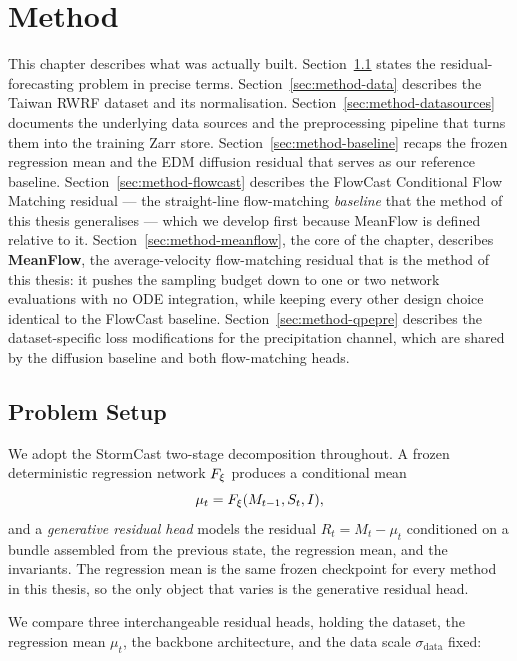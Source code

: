 
\chapter{Method}
\label{ch:method}

This chapter describes what was actually built. Section~\ref{sec:method-problem} states the residual-forecasting problem in precise terms. Section~\ref{sec:method-data} describes the Taiwan RWRF dataset and its normalisation. Section~\ref{sec:method-datasources} documents the underlying data sources and the preprocessing pipeline that turns them into the training Zarr store. Section~\ref{sec:method-baseline} recaps the frozen regression mean and the EDM diffusion residual that serves as our reference baseline. Section~\ref{sec:method-flowcast} describes the FlowCast Conditional Flow Matching residual --- the straight-line flow-matching \emph{baseline} that the method of this thesis generalises --- which we develop first because MeanFlow is defined relative to it. Section~\ref{sec:method-meanflow}, the core of the chapter, describes \textbf{MeanFlow}, the average-velocity flow-matching residual that is the method of this thesis: it pushes the sampling budget down to one or two network evaluations with no ODE integration, while keeping every other design choice identical to the FlowCast baseline. Section~\ref{sec:method-qpepre} describes the dataset-specific loss modifications for the precipitation channel, which are shared by the diffusion baseline and both flow-matching heads.

\section{Problem Setup}
\label{sec:method-problem}

We adopt the StormCast two-stage decomposition throughout. A frozen deterministic regression network $F_{\xi}$ produces a conditional mean
\begin{equation}
  \mu_t = F_{\xi}(M_{t-1}, S_t, I),
\end{equation}
and a \emph{generative residual head} models the residual $R_t = M_t - \mu_t$ conditioned on a bundle assembled from the previous state, the regression mean, and the invariants. The regression mean is the same frozen checkpoint for every method in this thesis, so the only object that varies is the generative residual head.

We compare three interchangeable residual heads, holding the dataset, the regression mean $\mu_t$, the backbone architecture, and the data scale $\sigma_{\text{data}}$ fixed:

